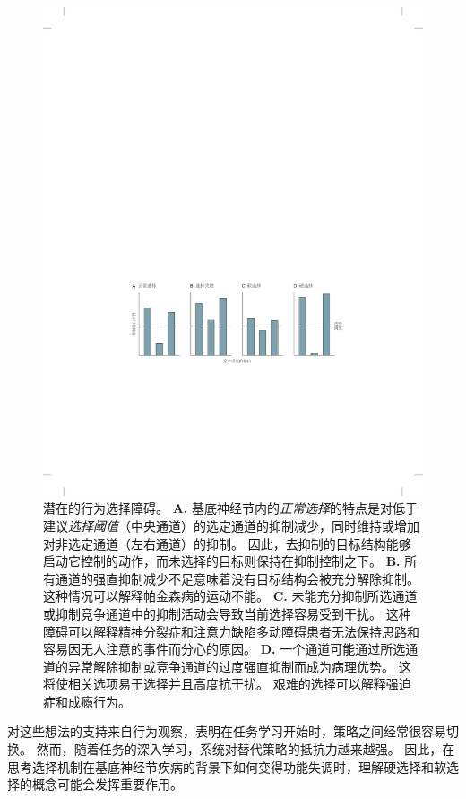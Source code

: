 \begin{figure}[htbp]
	\centering
	\includegraphics[width=0.92\linewidth]{chap38/fig_38_9}
	\caption{潜在的行为选择障碍。
		\textbf{A.} 基底神经节内的\textit{正常选择}的特点是对低于建议\textit{选择阈值}（中央通道）的选定通道的抑制减少，同时维持或增加对非选定通道（左右通道）的抑制。
		因此，去抑制的目标结构能够启动它控制的动作，而未选择的目标则保持在抑制控制之下。
		\textbf{B.} 所有通道的强直抑制减少不足意味着没有目标结构会被充分解除抑制。
		这种情况可以解释帕金森病的运动不能。
		\textbf{C.} 未能充分抑制所选通道或抑制竞争通道中的抑制活动会导致当前选择容易受到干扰。
		这种障碍可以解释精神分裂症和注意力缺陷多动障碍患者无法保持思路和容易因无人注意的事件而分心的原因。
		\textbf{D.} 一个通道可能通过所选通道的异常解除抑制或竞争通道的过度强直抑制而成为病理优势。
		这将使相关选项易于选择并且高度抗干扰。
		艰难的选择可以解释强迫症和成瘾行为。}
	\label{fig:38_9}
\end{figure}


对这些想法的支持来自行为观察，表明在任务学习开始时，策略之间经常很容易切换。
然而，随着任务的深入学习，系统对替代策略的抵抗力越来越强。
因此，在思考选择机制在基底神经节疾病的背景下如何变得功能失调时，理解硬选择和软选择的概念可能会发挥重要作用。



